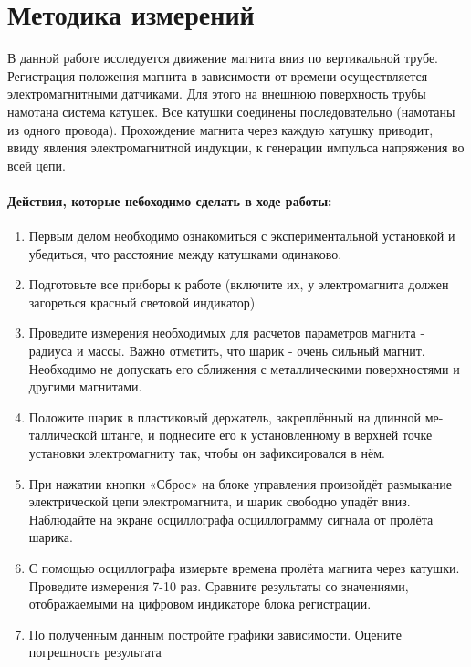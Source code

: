 \documentclass[a4paper, 10pt]{article}%
\begin{document}
\section{Методика измерений}

В данной работе исследуется движение магнита вниз по вертикальной трубе. Регистрация положения магнита в зависимости от времени осуществляется электромагнитными датчиками. Для этого на внешнюю поверхность трубы намотана система катушек. Все катушки соединены последовательно (намотаны из одного провода). Прохождение магнита через каждую катушку приводит, ввиду явления электромагнитной индукции, к генерации импульса напряжения во всей цепи. 


\paragraph{Действия, которые небоходимо сделать в ходе работы:}
\begin{enumerate}
    \item Первым делом необходимо ознакомиться с экспериментальной установкой и убедиться, что расстояние между катушками одинаково.
    \item Подготовьте все приборы к работе (включите их, у электромагнита должен загореться красный световой индикатор)
    \item Проведите измерения необходимых для расчетов параметров магнита - радиуса и массы. Важно отметить, что шарик - очень сильный магнит. Необходимо не допускать его сближения с металлическими поверхностями и другими магнитами. 
    \item Положите шарик в пластиковый держатель, закреплённый на длинной ме-
таллической штанге, и поднесите его к установленному в верхней точке
установки электромагниту так, чтобы он зафиксировался в нём.
\item При нажатии кнопки «Сброс» на блоке управления произойдёт размыкание
электрической цепи электромагнита, и шарик свободно упадёт вниз.
Наблюдайте на экране осциллографа осциллограмму сигнала от пролёта
шарика.
\item С помощью осциллографа измерьте времена пролёта
магнита через катушки. Проведите измерения 7-10 раз. 
Сравните результаты со значениями,
отображаемыми на цифровом индикаторе блока регистрации.
\item По полученным данным постройте графики зависимости. Оцените погрешность результата

\end{enumerate}
\end{document}
